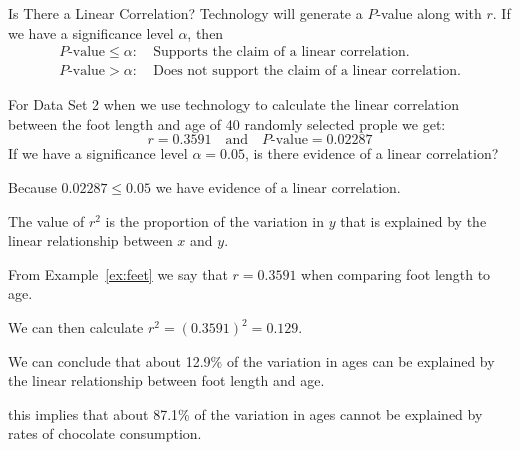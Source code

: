 \documentclass{beamer}
\begin{document}
\begin{frame}
\begin{block}{Is There a Linear Correlation?}
Technology will generate a $P$-value along with $r$. If we have a significance level $\alpha$, then
\begin{equation*}
\begin{aligned}
\text{$P$-value}\leq \alpha:& ~\text{Supports the claim of a linear correlation.}\\
\text{$P$-value}> \alpha:& ~\text{Does not support the claim of a linear correlation.}
\end{aligned}
\end{equation*}
\end{block}\pause

\begin{example}\label{ex:feet}
For Data Set 2  when we use technology to calculate the linear correlation between the foot length and age of 40 randomly selected prople we get:
\begin{equation*}
r=0.3591\quad\text{and}\quad P\text{-value}=0.02287
\end{equation*}\pause
If we have a significance level $\alpha=0.05$, is there evidence of a linear correlation?\pause

\vspace{1mm}
Because $0.02287\leq 0.05$ we have evidence of a linear correlation.
\end{example}
\end{frame}

\begin{frame}
\begin{note}
The value of $r^2$ is the proportion of the variation in $y$ that is explained by the linear relationship between $x$ and $y$.
\end{note}\pause

\begin{example}
From Example~\ref{ex:feet} we say that $r=0.3591$ when comparing foot length to age.\pause

\vspace{1mm}
We can then calculate $r^2={(0.3591)}^2=0.129$.\pause

\vspace{1mm}
We can conclude that about 12.9\% of the variation in ages can be explained by the linear relationship between foot length and age.\pause

\vspace{1mm}
this implies that about 87.1\% of the variation in ages cannot be explained by rates of chocolate consumption.
\end{example}
\end{frame}
\end{document}
